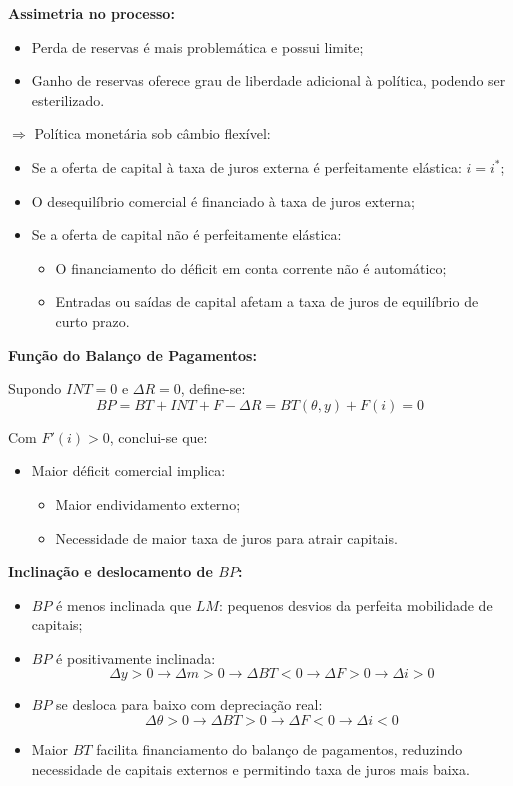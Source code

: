 \documentclass[a4paper,12pt]{article}[abntex2]
\begin{document}
\textbf{Assimetria no processo:}
\begin{itemize}
  \item Perda de reservas é mais problemática e possui limite;
  \item Ganho de reservas oferece grau de liberdade adicional à política, podendo ser esterilizado.
\end{itemize}

$\Rightarrow$ Política monetária sob câmbio flexível:
\begin{itemize}
  \item Se a oferta de capital à taxa de juros externa é perfeitamente elástica: $i = i^*$;
  \item O desequilíbrio comercial é financiado à taxa de juros externa;
  \item Se a oferta de capital não é perfeitamente elástica:
  \begin{itemize}
    \item O financiamento do déficit em conta corrente não é automático;
    \item Entradas ou saídas de capital afetam a taxa de juros de equilíbrio de curto prazo.
  \end{itemize}
\end{itemize}

\textbf{Função do Balanço de Pagamentos:}

Supondo $INT = 0$ e $\Delta R = 0$, define-se:
\[
BP = BT + INT + F - \Delta R = BT(\theta, y) + F(i) = 0
\]

Com $F'(i) > 0$, conclui-se que:
\begin{itemize}
  \item Maior déficit comercial implica:
  \begin{itemize}
    \item Maior endividamento externo;
    \item Necessidade de maior taxa de juros para atrair capitais.
  \end{itemize}
\end{itemize}

\textbf{Inclinação e deslocamento de $BP$:}
\begin{itemize}
  \item $BP$ é menos inclinada que $LM$: pequenos desvios da perfeita mobilidade de capitais;
  \item $BP$ é positivamente inclinada:
  \[
  \Delta y > 0 \rightarrow \Delta m > 0 \rightarrow \Delta BT < 0 \rightarrow \Delta F > 0 \rightarrow \Delta i > 0
  \]
  \item $BP$ se desloca para baixo com depreciação real:
  \[
  \Delta \theta > 0 \rightarrow \Delta BT > 0 \rightarrow \Delta F < 0 \rightarrow \Delta i < 0
  \]
  \item Maior $BT$ facilita financiamento do balanço de pagamentos, reduzindo necessidade de capitais externos e permitindo taxa de juros mais baixa.
\end{itemize}
\end{document}
